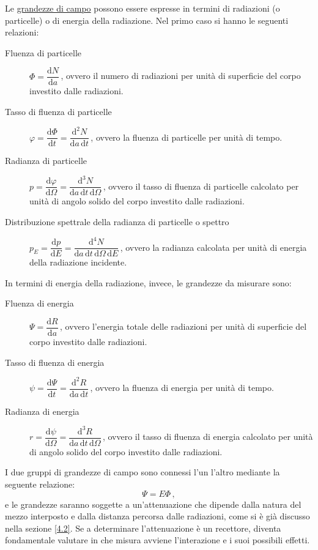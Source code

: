\documentclass{report}
\numberwithin{equation}{section}
\numberwithin{figure}{section}
\begin{document}
Le \underline{grandezze di campo} possono essere espresse in termini di radiazioni (o particelle) o di energia della radiazione. Nel primo caso si hanno le seguenti relazioni:
\begin{description}
    \item[Fluenza di particelle] $\Phi = \dfrac{\mathrm{d}N}{\mathrm{d}a}$\,, ovvero il numero di radiazioni per unità di superficie del corpo investito dalle radiazioni.
    \item[Tasso di fluenza di particelle] $\varphi = \dfrac{\mathrm{d}\Phi}{\mathrm{d}t} = \dfrac{\mathrm{d}^2N}{\mathrm{d}a\,\mathrm{d}t}$\,, ovvero la fluenza di particelle per unità di tempo.
    \item[Radianza di particelle] $p = \dfrac{\mathrm{d}\varphi}{\mathrm{d}\Omega} = \dfrac{\mathrm{d}^3N}{\mathrm{d}a\,\mathrm{d}t\,\mathrm{d}\Omega}$\,, ovvero il tasso di fluenza di particelle calcolato per unità di angolo solido del corpo investito dalle radiazioni.
    \item[Distribuzione spettrale della radianza di particelle o spettro] $p_E = \dfrac{\mathrm{d}p}{\mathrm{d}E} = \dfrac{\mathrm{d}^4N}{\mathrm{d}a\,\mathrm{d}t\,\mathrm{d}\Omega\,\mathrm{d}E}$\,, ovvero la radianza calcolata per unità di energia della radiazione incidente.
\end{description}
In termini di energia della radiazione, invece, le grandezze da misurare sono:
\begin{description}
    \item[Fluenza di energia] $\Psi = \dfrac{\mathrm{d}R}{\mathrm{d}a}$\,, ovvero l'energia totale delle radiazioni per unità di superficie del corpo investito dalle radiazioni.
    \item[Tasso di fluenza di energia] $\psi = \dfrac{\mathrm{d}\Psi}{\mathrm{d}t} = \dfrac{\mathrm{d}^2R}{\mathrm{d}a\,\mathrm{d}t}$\,, ovvero la fluenza di energia per unità di tempo.
    \item[Radianza di energia] $r = \dfrac{\mathrm{d}\psi}{\mathrm{d}\Omega} = \dfrac{\mathrm{d}^3R}{\mathrm{d}a\,\mathrm{d}t\,\mathrm{d}\Omega}$\,, ovvero il tasso di fluenza di energia calcolato per unità di angolo solido del corpo investito dalle radiazioni.
\end{description}
I due gruppi di grandezze di campo sono connessi l'un l'altro mediante la seguente relazione:
\begin{equation}
    \Psi = E \Phi\,,
\end{equation}
e le grandezze saranno soggette a un'attenuazione che dipende dalla natura del mezzo interposto e dalla distanza percorsa dalle radiazioni, come si è già discusso nella sezione \ref{4.2}. Se a determinare l'attenuazione è un recettore, diventa fondamentale valutare in che misura avviene l'interazione e i suoi possibili effetti.
\end{document}
